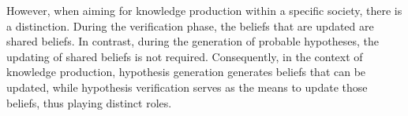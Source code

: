 \documentclass{article}
\begin{document}
However, when aiming for knowledge production within a specific society, there is a distinction. During the verification phase, the beliefs that are updated are shared beliefs. In contrast, during the generation of probable hypotheses, the updating of shared beliefs is not required. Consequently, in the context of knowledge production, hypothesis generation generates beliefs that can be updated, while hypothesis verification serves as the means to update those beliefs, thus playing distinct roles.




\end{document}
